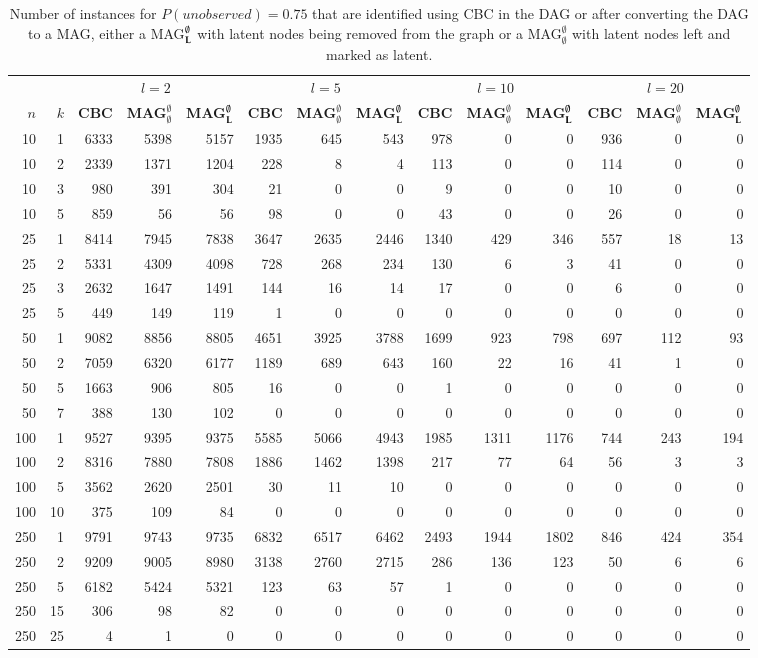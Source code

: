 \begin{table}
  \begin{center}
  \scriptsize
  \begin{tabular}{|rr | rrr| rrr| rrr| rrr|}
  \hline
   &&\multicolumn{3}{c|}{$l=2$} &\multicolumn{3}{c|}{$l=5$} &\multicolumn{3}{c|}{$l=10$} &\multicolumn{3}{c|}{$l=20$}\\
   \bfseries $n$ & \bfseries $k$
& \bfseries CBC & \bfseries MAG$^\emptyset_\emptyset$& \bfseries MAG$^\emptyset_{\bf L}$ 
& \bfseries CBC & \bfseries MAG$^\emptyset_\emptyset$& \bfseries MAG$^\emptyset_{\bf L}$ 
& \bfseries CBC & \bfseries MAG$^\emptyset_\emptyset$& \bfseries MAG$^\emptyset_{\bf L}$ 
& \bfseries CBC & \bfseries MAG$^\emptyset_\emptyset$& \bfseries MAG$^\emptyset_{\bf L}$ 
\\\hline
10&1&
6333&5398&5157&1935&645&543&978&0&0&936&0&0\\
10&2&
2339&1371&1204&228&8&4&113&0&0&114&0&0\\
10&3&
980&391&304&21&0&0&9&0&0&10&0&0\\
10&5&
859&56&56&98&0&0&43&0&0&26&0&0\\
\hline
25&1&
8414&7945&7838&3647&2635&2446&1340&429&346&557&18&13\\
25&2&
5331&4309&4098&728&268&234&130&6&3&41&0&0\\
25&3&
2632&1647&1491&144&16&14&17&0&0&6&0&0\\
25&5&
449&149&119&1&0&0&0&0&0&0&0&0\\
\hline
50&1&
9082&8856&8805&4651&3925&3788&1699&923&798&697&112&93\\
50&2&
7059&6320&6177&1189&689&643&160&22&16&41&1&0\\
50&5&
1663&906&805&16&0&0&1&0&0&0&0&0\\
50&7&
388&130&102&0&0&0&0&0&0&0&0&0\\
\hline
100&1&
9527&9395&9375&5585&5066&4943&1985&1311&1176&744&243&194\\
100&2&
8316&7880&7808&1886&1462&1398&217&77&64&56&3&3\\
100&5&
3562&2620&2501&30&11&10&0&0&0&0&0&0\\
100&10&
375&109&84&0&0&0&0&0&0&0&0&0\\
\hline
250&1&
9791&9743&9735&6832&6517&6462&2493&1944&1802&846&424&354\\
250&2&
9209&9005&8980&3138&2760&2715&286&136&123&50&6&6\\
250&5&
6182&5424&5321&123&63&57&1&0&0&0&0&0\\
250&15&
306&98&82&0&0&0&0&0&0&0&0&0\\
250&25&
4&1&0&0&0&0&0&0&0&0&0&0\\
\hline\end{tabular}
  \end{center}\vspace*{-3mm}
  \caption{Number of instances for $P(\textit{unobserved}) = 0.75$ that are identified using CBC in the DAG or after converting the DAG to a MAG, either a MAG$^\emptyset_{\bf L}$ with latent nodes being removed from the graph or a MAG$^\emptyset_\emptyset$ with latent nodes left and marked as latent.}\label{table:mags:0.75}
  \end{table}
